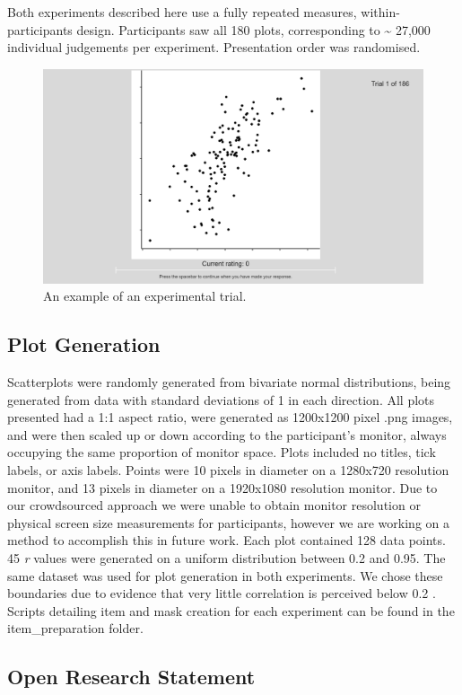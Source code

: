 \documentclass[preprint, 3p,
authoryear]{elsarticle} %
\begin{document}
Both experiments described here use a fully repeated measures,
within-participants design. Participants saw all 180 plots,
corresponding to \textasciitilde{} 27,000 individual judgements per
experiment. Presentation order was randomised.

\begin{figure}

\includegraphics[width=0.5\linewidth]{images/example-trial} \hfill{}

\caption{\label{example-trial}An example of an experimental trial.}\label{fig:example-trial}
\end{figure}

\hypertarget{plot-generation}{%
\subsection{Plot Generation}\label{plot-generation}}

Scatterplots were randomly generated from bivariate normal
distributions, being generated from data with standard deviations of 1
in each direction. All plots presented had a 1:1 aspect ratio, were
generated as 1200x1200 pixel .png images, and were then scaled up or
down according to the participant's monitor, always occupying the same
proportion of monitor space. Plots included no titles, tick labels, or
axis labels. Points were 10 pixels in diameter on a 1280x720 resolution
monitor, and 13 pixels in diameter on a 1920x1080 resolution monitor.
Due to our crowdsourced approach we were unable to obtain monitor
resolution or physical screen size measurements for participants,
however we are working on a method to accomplish this in future work.
Each plot contained 128 data points. 45 \emph{r} values were generated
on a uniform distribution between 0.2 and 0.95. The same dataset was
used for plot generation in both experiments. We chose these boundaries
due to evidence that very little correlation is perceived below 0.2
\citep{bobko_1979, cleveland_1982, strahan_1978}. Scripts detailing item
and mask creation for each experiment can be found in the
item\_preparation folder.

\hypertarget{open-research-statement}{%
\subsection{Open Research Statement}\label{open-research-statement}}
\end{document}
